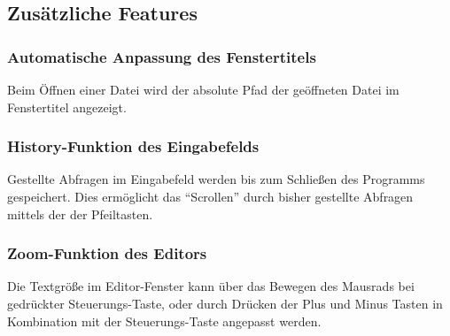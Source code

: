 \documentclass[parskip=full,11pt,twoside]{scrartcl}
\begin{document}
\subsection{Zusätzliche Features}
	\subsubsection{Automatische Anpassung des Fenstertitels}
		Beim Öffnen einer Datei wird der absolute Pfad der geöffneten Datei im Fenstertitel angezeigt.
	
	\subsubsection{History-Funktion des Eingabefelds}
		Gestellte Abfragen im Eingabefeld werden bis zum Schließen des Programms gespeichert. Dies ermöglicht das \enquote{Scrollen} durch bisher gestellte Abfragen mittels der der Pfeiltasten.
		
	\subsubsection{Zoom-Funktion des Editors}
		Die Textgröße im Editor-Fenster kann über das Bewegen des Mausrads bei gedrückter Steuerungs-Taste, oder durch Drücken der Plus und Minus Tasten in Kombination mit der Steuerungs-Taste angepasst werden.
\end{document}
